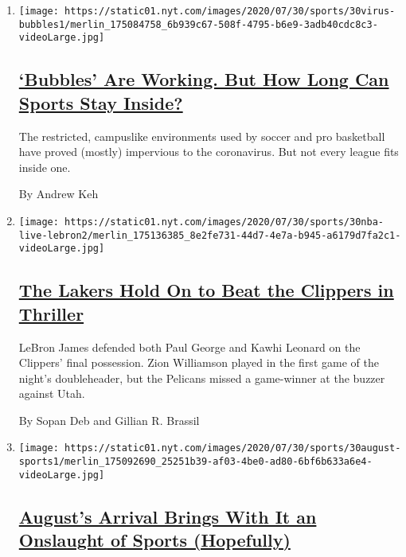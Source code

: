 \begin{enumerate}
\def\labelenumi{\arabic{enumi}.}
\item
  \texttt{[image: https://static01.nyt.com/images/2020/07/30/sports/30virus-bubbles1/merlin\_175084758\_6b939c67-508f-4795-b6e9-3adb40cdc8c3-videoLarge.jpg]}

  \hypertarget{bubbles-are-working-but-how-long-can-sports-stay-inside}{%
  \subsection{\texorpdfstring{\href{/2020/07/30/sports/basketball/sports-bubble-nba-mlb.html}{`Bubbles'
  Are Working. But How Long Can Sports Stay
  Inside?}}{`Bubbles' Are Working. But How Long Can Sports Stay Inside?}}\label{bubbles-are-working-but-how-long-can-sports-stay-inside}}

  The restricted, campuslike environments used by soccer and pro
  basketball have proved (mostly) impervious to the coronavirus. But not
  every league fits inside one.

  By Andrew Keh
\item
  \texttt{[image: https://static01.nyt.com/images/2020/07/30/sports/30nba-live-lebron2/merlin\_175136385\_8e2fe731-44d7-4e7a-b945-a6179d7fa2c1-videoLarge.jpg]}

  \hypertarget{the-lakers-hold-on-to-beat-the-clippers-in-thriller}{%
  \subsection{\texorpdfstring{\href{/2020/07/30/sports/basketball/clippers-lakers.html}{The
  Lakers Hold On to Beat the Clippers in
  Thriller}}{The Lakers Hold On to Beat the Clippers in Thriller}}\label{the-lakers-hold-on-to-beat-the-clippers-in-thriller}}

  LeBron James defended both Paul George and Kawhi Leonard on the
  Clippers' final possession. Zion Williamson played in the first game
  of the night's doubleheader, but the Pelicans missed a game-winner at
  the buzzer against Utah.

  By Sopan Deb and Gillian R. Brassil
\item
  \texttt{[image: https://static01.nyt.com/images/2020/07/30/sports/30august-sports1/merlin\_175092690\_25251b39-af03-4be0-ad80-6bf6b633a6e4-videoLarge.jpg]}

  \hypertarget{augusts-arrival-brings-with-it-an-onslaught-of-sports-hopefully}{%
  \subsection{\texorpdfstring{\href{/2020/07/30/sports/nhl-us-open-champions-league-restart.html}{August's
  Arrival Brings With It an Onslaught of Sports
  (Hopefully)}}{August's Arrival Brings With It an Onslaught of Sports (Hopefully)}}\label{augusts-arrival-brings-with-it-an-onslaught-of-sports-hopefully}}


\end{enumerate}
